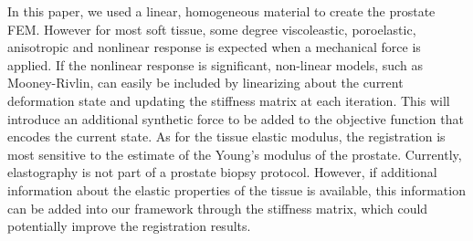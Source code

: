 \documentclass[journal]{IEEEtran}
\begin{document}
In this paper, we used a linear, homogeneous material to create the prostate FEM. However for most soft tissue, some degree viscoleastic, poroelastic, anisotropic and nonlinear response is expected when a mechanical force is applied. If the nonlinear response is significant, non-linear models, such as Mooney-Rivlin, can easily be included by linearizing about the current deformation state and updating the stiffness matrix at each iteration. This will introduce an additional synthetic force to be added to the objective function that encodes the current state.  As for the tissue elastic modulus, the registration is most sensitive to the estimate of the Young's modulus of the prostate. Currently, elastography is not part of a prostate biopsy protocol. However, if additional information about the elastic properties of the tissue is available, this information can be added into our framework through the stiffness matrix, which could potentially improve the registration results.
\end{document}
